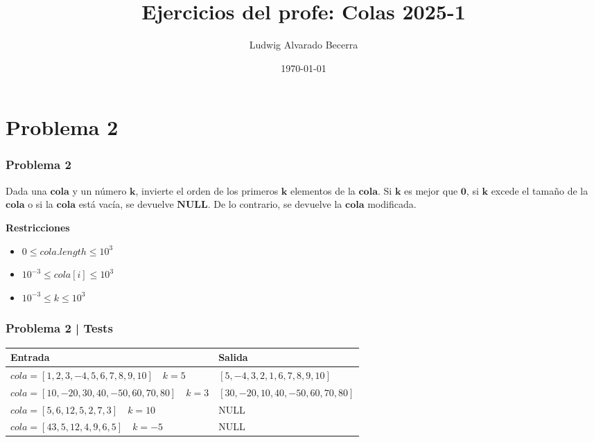 \documentclass[17pt, t, lualatex]{beamer}
\title{\LARGE Ejercicios del profe: Colas 2025-1}
\date{\today}
\institute[UJTL]{Universidad Jorge Tadeo Lozano - Semillero de Programación Competitiva}
\author{Ludwig Alvarado Becerra}
\begin{document}
\inserttitlepage

\section{Problema 2}

\insertsectionpage


\begin{frame}
  \frametitle{Problema 2}

  Dada una $\mathbf{cola}$ y un número $\mathbf{k}$, invierte el orden de los primeros $\mathbf{k}$ elementos de la $\mathbf{cola}$. Si $\mathbf{k}$ es mejor que $\mathbf{0}$, si $\mathbf{k}$ excede el tamaño de la $\mathbf{cola}$ o si la $\mathbf{cola}$ está vacía, se devuelve $\mathbf{NULL}$. De lo contrario, se devuelve la $\mathbf{cola}$ modificada.

  \textbf{Restricciones}

  \begin{itemize}
    \item $0 \leq cola.length \leq 10^{3}$
    \item $10^{-3} \leq cola[i] \leq 10^{3}$
    \item $10^{-3} \leq k \leq 10^{3}$
  \end{itemize}

\end{frame}

\begin{frame}
  \frametitle{Problema 2 | Tests}

  \begin{table}[h]
  \centering
  \begin{tabular}{|>{\centering\arraybackslash}p{}|>{\centering\arraybackslash}p{}|}
    \hline
    \textbf{Entrada} & \textbf{Salida} \\ \hline
    $cola = [1, 2, 3, -4, 5, 6, 7, 8, 9, 10] \quad k = 5$ & $[5, -4, 3, 2, 1, 6, 7, 8, 9, 10]$ \\ \hline
    $cola = [10, -20, 30, 40, -50, 60, 70, 80] \quad k = 3$ & $[30, -20, 10, 40, -50, 60, 70, 80]$ \\ \hline
    $cola = [5, 6, 12, 5, 2, 7, 3] \quad k = 10$ & NULL \\ \hline
    $cola = [43, 5, 12, 4, 9, 6, 5] \quad k = -5$ & NULL \\ \hline
  \end{tabular}
\end{table}

\end{frame}
\end{document}
